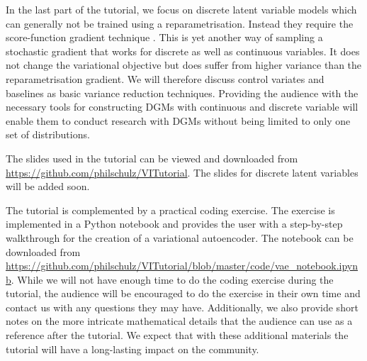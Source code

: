In the last part of the tutorial, we focus on discrete latent variable models which can generally
not be trained using a reparametrisation. Instead they require the score-function gradient technique
\citep{Williams:1992, PaisleyEtAl:2012}.
This is yet another way of sampling a stochastic gradient that works for discrete as well as continuous variables. It does not change the variational objective but does suffer from higher variance than
the reparametrisation gradient. We will therefore discuss control variates and baselines as basic
variance reduction techniques. Providing the audience with the necessary tools for constructing DGMs with continuous
and discrete variable will enable them to conduct research with DGMs without being limited
to only one set of distributions.

The slides used in the tutorial can be viewed and downloaded from \url{https://github.com/philschulz/VITutorial}. The slides for discrete latent variables will be added soon.

The tutorial is complemented by a practical coding exercise. 
The exercise is implemented
in a Python notebook and provides the user with a step-by-step walkthrough for the 
creation of a variational autoencoder. The notebook can be downloaded
from \url{https://github.com/philschulz/VITutorial/blob/master/code/vae_notebook.ipynb}.
While we will not have enough
time to do the coding exercise during the tutorial, the audience will be encouraged to do the
exercise in their own time and contact us with any questions they may have. Additionally, we also
provide short notes on the more intricate mathematical details that the audience can use as 
a reference after the tutorial. We expect that with these additional materials the tutorial will
have a long-lasting impact on the community.